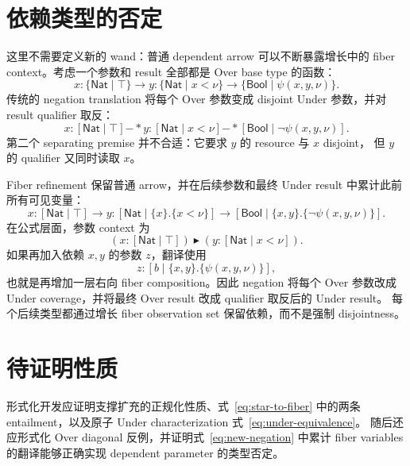 \documentclass[10pt]{ctexart}
\newcommand{\Bool}{\mathsf{Bool}}
\newcommand{\rfcomp}{\mathbin{\blacktriangleright}}
\begin{document}
\section{依赖类型的否定}

这里不需要定义新的 wand：普通 dependent arrow 可以不断暴露增长中的 fiber
context。考虑一个参数和 result 全部都是 Over base type 的函数：
\begin{equation}\label{eq:safety-example}
  x:\{\mathsf{Nat}\mid\top\}\to
  y:\{\mathsf{Nat}\mid x<\nu\}\to
  \{\Bool\mid\psi(x,y,\nu)\}.
\end{equation}
传统的 negation translation 将每个 Over 参数变成 disjoint Under 参数，并对
result qualifier 取反：
\begin{equation}\label{eq:old-negation}
  x:[\mathsf{Nat}\mid\top]\mathbin{-*}
  y:[\mathsf{Nat}\mid x<\nu]\mathbin{-*}
  [\Bool\mid\neg\psi(x,y,\nu)].
\end{equation}
第二个 separating premise 并不合适：它要求 $y$ 的 resource 与 $x$ disjoint，
但 $y$ 的 qualifier 又同时读取 $x$。

Fiber refinement 保留普通 arrow，并在后续参数和最终 Under result 中累计此前
所有可见变量：
\begin{equation}\label{eq:new-negation}
  x:[\mathsf{Nat}\mid\top]\to
  y:[\mathsf{Nat}\mid\{x\}.\{x<\nu\}]\to
  [\Bool\mid\{x,y\}.\{\neg\psi(x,y,\nu)\}].
\end{equation}
在公式层面，参数 context 为
\[
  (x:[\mathsf{Nat}\mid\top])
  \rfcomp
  (y:[\mathsf{Nat}\mid x<\nu]).
\]
如果再加入依赖 $x,y$ 的参数 $z$，翻译使用
\[
  z:[b\mid\{x,y\}.\{\psi(x,y,\nu)\}],
\]
也就是再增加一层右向 fiber composition。因此 negation 将每个 Over 参数改成
Under coverage，并将最终 Over result 改成 qualifier 取反后的 Under result。
每个后续类型都通过增长 fiber observation set 保留依赖，而不是强制
disjointness。

\section{待证明性质}

形式化开发应证明支撑扩充的正规化性质、式~\eqref{eq:star-to-fiber} 中的两条
entailment，以及原子 Under characterization 式~\eqref{eq:under-equivalence}。
随后还应形式化 Over diagonal 反例，并证明式~\eqref{eq:new-negation} 中累计
fiber variables 的翻译能够正确实现 dependent parameter 的类型否定。
\end{document}
